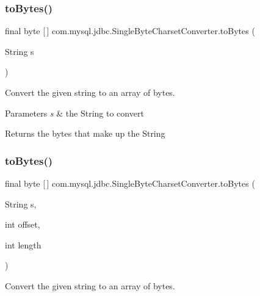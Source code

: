 \subsubsection{\texorpdfstring{to\+Bytes()}{toBytes()}\hspace{0.1cm}{\footnotesize\ttfamily [1/2]}}
{\footnotesize\ttfamily final byte \mbox{[}$\,$\mbox{]} com.\+mysql.\+jdbc.\+Single\+Byte\+Charset\+Converter.\+to\+Bytes (\begin{DoxyParamCaption}\item[{String}]{s }\end{DoxyParamCaption})}

Convert the given string to an array of bytes.


\begin{DoxyParams}{Parameters}
{\em s} & the String to convert \\
\hline
\end{DoxyParams}
\begin{DoxyReturn}{Returns}
the bytes that make up the String 
\end{DoxyReturn}
\mbox{\label{classcom_1_1mysql_1_1jdbc_1_1_single_byte_charset_converter_ac88a7b12c138cada583fed31cd800bb7}} 
\subsubsection{\texorpdfstring{to\+Bytes()}{toBytes()}\hspace{0.1cm}{\footnotesize\ttfamily [2/2]}}
{\footnotesize\ttfamily final byte \mbox{[}$\,$\mbox{]} com.\+mysql.\+jdbc.\+Single\+Byte\+Charset\+Converter.\+to\+Bytes (\begin{DoxyParamCaption}\item[{String}]{s,  }\item[{int}]{offset,  }\item[{int}]{length }\end{DoxyParamCaption})}

Convert the given string to an array of bytes.


